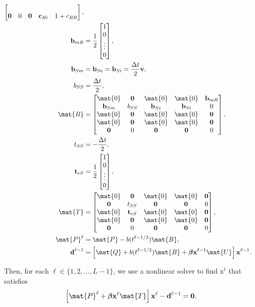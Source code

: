 \documentclass{jpmarticle}
\renewcommand{\vec}[1]{\boldsymbol{\mathrm{#1}}}
\let\subequationsorig\subequations%
\let\endsubequationsorig\endsubequations%
\renewenvironment{subequations}{
  \subequationsorig
  \renewcommand{\theequation}{\theparentequation.\arabic{equation}}
}{
  \endsubequationsorig
}
\begin{document}
\begin{subequations}
\begin{align}
\begin{bmatrix}
      \\
      \vec{0} & 0 & \vec{0} & \vec{c}_{Ri} & 1 + c_{RR}
    \end{bmatrix},
    \\
    \vec{b}_{mR} &=
    \frac{1}{2}
    \begin{bmatrix}
      1 \\ 0 \\ \vdots \\ 0
    \end{bmatrix},
    \\
    \vec{b}_{Sm} &=
    \vec{b}_{Se} =
    \vec{b}_{Si} =
    \frac{\Delta t}{2} \vec{v},
    \\
    b_{SS} &=
    \frac{\Delta t}{2},
    \\
    \mat{B} &=
    \begin{bmatrix}
      \mat{0} & \vec{0} & \mat{0} & \mat{0} & \vec{b}_{mR}
      \\
      \vec{b}_{Sm} & b_{SS} & \vec{b}_{Se} & \vec{b}_{Si} & 0
      \\
      \mat{0} & \vec{0} & \mat{0} & \mat{0} & \vec{0}
      \\
      \mat{0} & \vec{0} & \mat{0} & \mat{0} & \vec{0}
      \\
      \vec{0} & 0 & \vec{0} & \vec{0} & 0
    \end{bmatrix},
    \\
    t_{SS} &=
    - \frac{\Delta t}{2},
    \\
    \vec{t}_{eS} &=
    \frac{1}{2}
    \begin{bmatrix}
      1 \\ 0 \\ \vdots \\ 0
    \end{bmatrix},
    \\
    \mat{T} &=
    \begin{bmatrix}
      \mat{0} & \vec{0} & \mat{0} & \mat{0} & \vec{0}
      \\
      \vec{0} & t_{SS} & \vec{0} & \vec{0} & 0
      \\
      \mat{0} & \vec{t}_{eS} & \mat{0} & \mat{0} & \vec{0}
      \\
      \mat{0} & \vec{0} & \mat{0} & \mat{0} & \vec{0}
      \\
      \vec{0} & 0 & \vec{0} & \vec{0} & 0
    \end{bmatrix},
    \\
    \mat{P}^{\ell} &=
    \mat{P} - b(t^{\ell - 1 / 2}) \mat{B},
    \\
    \vec{d}^{\ell - 1} &=
    \left[
      \mat{Q}
      + b(t^{\ell - 1 / 2}) \mat{B}
      + \vec{\beta} \vec{x}^{\ell - 1} \mat{U}
    \right] \vec{x}^{\ell - 1}.
  \end{align}
\end{subequations}
Then, for each $\ell \in \{1, 2, \ldots, L - 1\}$,
we use a nonlinear solver to find $\vec{x}^{\ell}$ that satisfies
\begin{equation}
  \left[
    \mat{P}^{\ell}
    + \vec{\beta} \vec{x}^{\ell} \mat{T}
  \right] \vec{x}^{\ell}
  - \vec{d}^{\ell - 1}
  = \vec{0}.
\end{equation}
\end{document}
